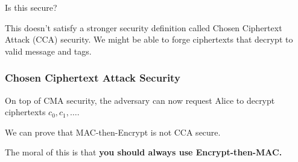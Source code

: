 \begin{ques*}
    Is this secure?
\end{ques*}

This doesn't satisfy a stronger security definition called Chosen Ciphertext Attack (CCA) security. We might be able to forge ciphertexts that decrypt to valid message and tags.

\subsubsection{Chosen Ciphertext Attack Security}
On top of CMA security, the adversary can now request Alice to decrypt ciphertexts $c_0, c_1, \dots$.


We can prove that MAC-then-Encrypt is not CCA secure.

The moral of this is that \textbf{you should always use Encrypt-then-MAC.}

